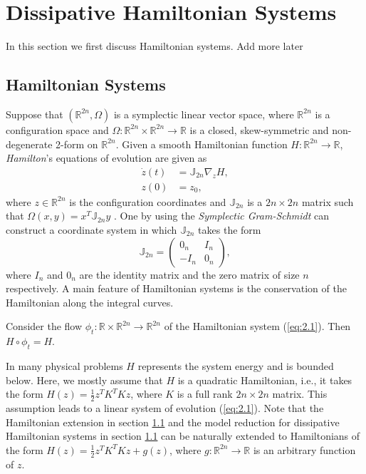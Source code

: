 \section{Dissipative Hamiltonian Systems} \label{sec:2}
In this section we first discuss Hamiltonian systems. Add more later

\subsection{Hamiltonian Systems} Suppose that $(\mathbb{R}^{2n},\Omega)$ is a symplectic linear vector space, where $\mathbb{R}^{2n}$ is a configuration space and $\Omega:\mathbb{R}^{2n}\times \mathbb{R}^{2n} \to \mathbb R$ is a closed, skew-symmetric and non-degenerate 2-form on $\mathbb{R}^{2n}$. Given a smooth Hamiltonian function $H:\mathbb{R}^{2n}\to \mathbb R$, \emph{Hamilton}'s equations of evolution are given as
\begin{equation} \label{eq:2.1}
	\begin{aligned}
	\dot {z}(t) &= \mathbb J_{2n} \nabla_{z} H, \\
	z(0) &= z_0,
	\end{aligned}
\end{equation}
where $z \in\mathbb R^{2n}$ is the configuration coordinates and $\mathbb J_{2n}$ is a $2n\times 2n$ matrix such that $\Omega(x,y) = x^T \mathbb J_{2n} y$ \cite{Marsden:2010:IMS:1965128}. One by using the \emph{Symplectic Gram-Schmidt} \cite{de2006symplectic} can construct a coordinate system in which $\mathbb J_{2n}$ takes the form
\begin{equation} \label{eq:2.2}
	\mathbb{J}_{2n} = 
	\begin{pmatrix}
		0_n & I_n \\
		-I_n & 0_n
	\end{pmatrix},
\end{equation}
where $I_n$ and $0_n$ are the identity matrix and the zero matrix of size $n$ respectively. A main feature of Hamiltonian systems is the conservation of the Hamiltonian along the integral curves.
\begin{theorem} \label{theorem:2.1}
\cite{Marsden:2010:IMS:1965128} Consider the flow $\phi_t:\mathbb R\times \mathbb R^{2n} \to \mathbb R^{2n}$ of the Hamiltonian system (\ref{eq:2.1}). Then $H\circ \phi_t = H$.
\end{theorem}

In many physical problems $H$ represents the system energy and is bounded below. Here, we mostly assume that $H$ is a quadratic Hamiltonian, i.e., it takes the form $H(z) = \frac 1 2 z^T K^T K z$, where $K$ is a full rank $2n\times 2n$ matrix. This assumption leads to a linear system of evolution (\ref{eq:2.1}). Note that the Hamiltonian extension in section \ref{} and the model reduction for dissipative Hamiltonian systems in section \ref{} can be naturally extended to Hamiltonians of the form $H(z) = \frac 1 2 z^T K^T K z + g(z)$, where $g:\mathbb R^{2n} \to \mathbb R$ is an arbitrary function of $z$. 

